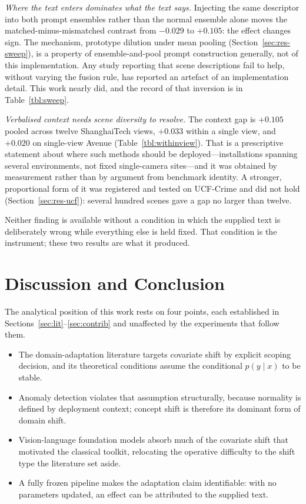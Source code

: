 \documentclass[a4paper,fleqn]{cas-sc}
\begin{document}
\emph{Where the text enters dominates what the text says.} Injecting the same
descriptor into both prompt ensembles rather than the normal ensemble alone
moves the matched-minus-mismatched contrast from $-0.029$ to $+0.105$: the
effect changes sign. The mechanism, prototype dilution under mean pooling
(Section~\ref{sec:res-sweep}), is a property of ensemble-and-pool prompt
construction generally, not of this implementation. Any study reporting that
scene descriptions fail to help, without varying the fusion rule, has reported
an artefact of an implementation detail. This work nearly did, and the record of
that inversion is in Table~\ref{tbl:sweep}.

\emph{Verbalised context needs scene diversity to resolve.} The context gap is
$+0.105$ pooled across twelve ShanghaiTech views, $+0.033$ within a single view,
and $+0.020$ on single-view Avenue (Table~\ref{tbl:withinview}). That is a
prescriptive statement about where such methods should be deployed---installations
spanning several environments, not fixed single-camera sites---and it was obtained
by measurement rather than by argument from benchmark identity. A stronger,
proportional form of it was registered and tested on UCF-Crime and did not hold
(Section~\ref{sec:res-ucf}): several hundred scenes gave a gap no larger than
twelve.

Neither finding is available without a condition in which the supplied text is
deliberately wrong while everything else is held fixed. That condition is the
instrument; these two results are what it produced.

\section{Discussion and Conclusion}
\label{sec:conclusion}

The analytical position of this work rests on four points, each established in
Sections~\ref{sec:lit}--\ref{sec:contrib} and unaffected by the experiments that
follow them.

\begin{itemize}
  \item The domain-adaptation literature targets covariate shift by explicit
        scoping decision, and its theoretical conditions assume the conditional
        $p(y\mid x)$ to be stable.
  \item Anomaly detection violates that assumption structurally, because
        normality is defined by deployment context; concept shift is therefore
        its dominant form of domain shift.
  \item Vision-language foundation models absorb much of the covariate shift that
        motivated the classical toolkit, relocating the operative difficulty to
        the shift type the literature set aside.
  \item A fully frozen pipeline makes the adaptation claim identifiable: with no
        parameters updated, an effect can be attributed to the supplied text.
\end{itemize}
\end{document}
